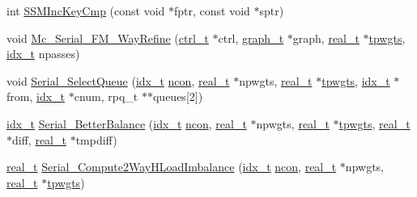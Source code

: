 \begin{DoxyCompactItemize}
\item 
int \hyperlink{a00407_a786beb5cf2ec4aaae09596c302eb510d}{S\+S\+M\+Inc\+Key\+Cmp} (const void $\ast$fptr, const void $\ast$sptr)
\item 
void \hyperlink{a00407_a9e8699c39f355dea5ad38e1dfee7b7cf}{Mc\+\_\+\+Serial\+\_\+\+F\+M\+\_\+Way\+Refine} (\hyperlink{a00742}{ctrl\+\_\+t} $\ast$ctrl, \hyperlink{a00734}{graph\+\_\+t} $\ast$graph, \hyperlink{a00876_a1924a4f6907cc3833213aba1f07fcbe9}{real\+\_\+t} $\ast$\hyperlink{a00879_aa91786cd8ea996ec49ed5b382eb7fc2f}{tpwgts}, \hyperlink{a00876_aaa5262be3e700770163401acb0150f52}{idx\+\_\+t} npasses)
\item 
void \hyperlink{a00407_a9f3e61c58695c143989d96c57154fb80}{Serial\+\_\+\+Select\+Queue} (\hyperlink{a00876_aaa5262be3e700770163401acb0150f52}{idx\+\_\+t} \hyperlink{a00879_ac1dd31740e8f97fb57dc917ded30253f}{ncon}, \hyperlink{a00876_a1924a4f6907cc3833213aba1f07fcbe9}{real\+\_\+t} $\ast$npwgts, \hyperlink{a00876_a1924a4f6907cc3833213aba1f07fcbe9}{real\+\_\+t} $\ast$\hyperlink{a00879_aa91786cd8ea996ec49ed5b382eb7fc2f}{tpwgts}, \hyperlink{a00876_aaa5262be3e700770163401acb0150f52}{idx\+\_\+t} $\ast$from, \hyperlink{a00876_aaa5262be3e700770163401acb0150f52}{idx\+\_\+t} $\ast$cnum, rpq\+\_\+t $\ast$$\ast$queues\mbox{[}2\mbox{]})
\item 
\hyperlink{a00876_aaa5262be3e700770163401acb0150f52}{idx\+\_\+t} \hyperlink{a00407_a62ce727c3eee17b8d8add92ffeb8adbe}{Serial\+\_\+\+Better\+Balance} (\hyperlink{a00876_aaa5262be3e700770163401acb0150f52}{idx\+\_\+t} \hyperlink{a00879_ac1dd31740e8f97fb57dc917ded30253f}{ncon}, \hyperlink{a00876_a1924a4f6907cc3833213aba1f07fcbe9}{real\+\_\+t} $\ast$npwgts, \hyperlink{a00876_a1924a4f6907cc3833213aba1f07fcbe9}{real\+\_\+t} $\ast$\hyperlink{a00879_aa91786cd8ea996ec49ed5b382eb7fc2f}{tpwgts}, \hyperlink{a00876_a1924a4f6907cc3833213aba1f07fcbe9}{real\+\_\+t} $\ast$diff, \hyperlink{a00876_a1924a4f6907cc3833213aba1f07fcbe9}{real\+\_\+t} $\ast$tmpdiff)
\item 
\hyperlink{a00876_a1924a4f6907cc3833213aba1f07fcbe9}{real\+\_\+t} \hyperlink{a00407_afa6aadaf308fc164c98e67d2511daf03}{Serial\+\_\+\+Compute2\+Way\+H\+Load\+Imbalance} (\hyperlink{a00876_aaa5262be3e700770163401acb0150f52}{idx\+\_\+t} \hyperlink{a00879_ac1dd31740e8f97fb57dc917ded30253f}{ncon}, \hyperlink{a00876_a1924a4f6907cc3833213aba1f07fcbe9}{real\+\_\+t} $\ast$npwgts, \hyperlink{a00876_a1924a4f6907cc3833213aba1f07fcbe9}{real\+\_\+t} $\ast$\hyperlink{a00879_aa91786cd8ea996ec49ed5b382eb7fc2f}{tpwgts})
\item 
$$
\end{DoxyCompactItemize}
